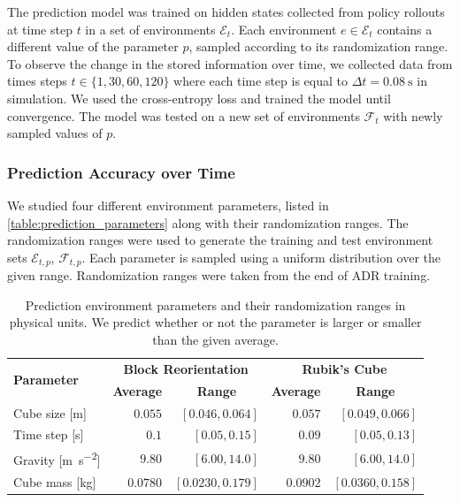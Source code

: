 The prediction model was trained on hidden states collected from policy rollouts at time step $t$ in a set of environments $\mathcal{E}_t$. Each environment $e \in \mathcal{E}_t$ contains a different value of the parameter $p$, sampled according to its randomization range. To observe the change in the stored information over time, we collected data from times steps $t \in \{1, 30, 60, 120\}$ where each time step is equal to $\Delta t = \SI{0.08}{\second}$ in simulation. We used the cross-entropy loss and trained the model until convergence. The model was tested on a new set of environments $\mathcal{F}_t$ with newly sampled values of $p$.
\subsubsection{Prediction Accuracy over Time}

We studied four different environment parameters, listed in \autoref{table:prediction_parameters} along with their randomization ranges. The randomization ranges were used to generate the training and test environment sets $\mathcal{E}_{t, p}$, $\mathcal{F}_{t, p}$. Each parameter is sampled using a uniform distribution over the given range. Randomization ranges were taken from the end of ADR training.

\begin{table}[h]
    \caption{Prediction environment parameters and their randomization ranges in physical units. We predict whether or not the parameter is larger or smaller than the given average.}
    \centering
    \renewcommand{\arraystretch}{1.3}
    \begin{tabular}{@{}lrrrr@{}}
        \toprule
        \multirow{2}{*}{\textbf{Parameter}} & \multicolumn{2}{c}{\textbf{Block Reorientation}} & \multicolumn{2}{c}{\textbf{Rubik's Cube}} \\
        & \multicolumn{1}{c}{\textbf{Average}}
        & \multicolumn{1}{c}{\textbf{Range}}
        & \multicolumn{1}{c}{\textbf{Average}}
        & \multicolumn{1}{c}{\textbf{Range}} \\
        \midrule
        Cube size [\si{\meter}] & $0.055$ & $[0.046, 0.064]$ & $0.057$ & $[0.049, 0.066]$ \\
        Time step [\si{\second}] & $0.1$ & $[0.05, 0.15]$ & $0.09$ & $[0.05, 0.13]$ \\
        Gravity [\si{\meter\per\square\second}] & $9.80$ & $[6.00, 14.0]$ & $9.80$ & $[6.00, 14.0]$ \\
        Cube mass [\si{\kilogram}] & $0.0780$ & $[0.0230, 0.179]$ & $0.0902$ & $[0.0360, 0.158]$\\
        \bottomrule
    \end{tabular}
    \label{table:prediction_parameters}
\end{table}

